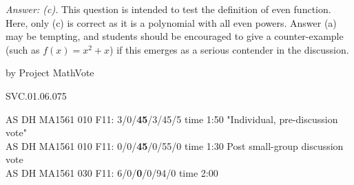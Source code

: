 {\it Answer: (c).}  This question is intended to test the definition of even function.  Here, only (c) is correct as it is a polynomial with all even powers.  Answer (a) may be tempting, and students should be encouraged to give a counter-example (such as $f(x) = x^2 + x$) if this emerges as a serious contender in the discussion.

\medskip
by Project MathVote

SVC.01.06.075

AS DH MA1561 010 F11: 3/0/{\bf45}/3/45/5 time 1:50 "Individual, pre-discussion vote" \\
AS DH MA1561 010 F11: 0/0/{\bf45}/0/55/0 time 1:30 Post small-group discussion vote \\
AS DH MA1561 030 F11: 6/0/{\bf0}/0/94/0 time 2:00  \\
